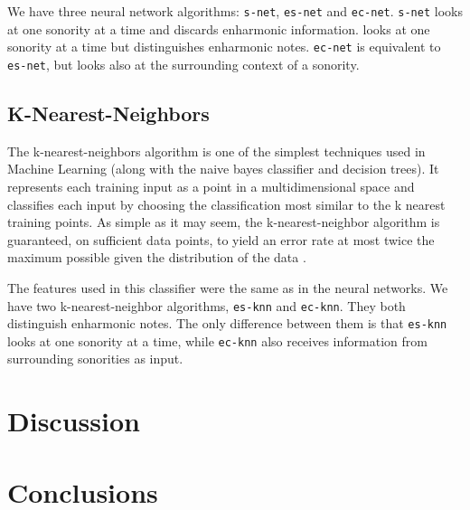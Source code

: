 \documentclass{article}
\newcommand{\comment}[1]{}
\begin{document}
We have three neural network algorithms: \texttt{s-net},
\texttt{es-net} and \texttt{ec-net}. \texttt{s-net} looks at one
sonority at a time and discards enharmonic information. 
looks at one sonority at a time but distinguishes enharmonic
notes. \texttt{ec-net} is equivalent to \texttt{es-net}, but looks
also at the surrounding context of a sonority.

\subsection{K-Nearest-Neighbors}
\label{sec:knn}

\comment{
  ==> baseline (similar a pardo, templates automaticos)
  ==> good theoretical performance (citar \cite{fix.ea:important}) 
  ==> very good practical performance (citar
  \cite{gomez.ea:estimating})
}

The k-nearest-neighbors algorithm is one of the simplest techniques
used in Machine Learning (along with the naive bayes classifier and
decision trees). It represents each training input as a point in a
multidimensional space and classifies each input by choosing the
classification most similar to the k nearest training points. As
simple as it may seem, the k-nearest-neighbor algorithm is guaranteed,
on sufficient data points, to yield an error rate at most twice the
maximum possible given the distribution of the data
\cite{fix.ea:important}.

The features used in this classifier were the same as in the neural
networks. We have two k-nearest-neighbor algorithms, \texttt{es-knn}
and \texttt{ec-knn}. They both distinguish enharmonic notes. The only
difference between them is that \texttt{es-knn} looks at one sonority
at a time, while \texttt{ec-knn} also receives information from
surrounding sonorities as input.

\section{Discussion}
\label{sec:discussion}



\section{Conclusions}
\label{sec:conclusions}




\end{document}

